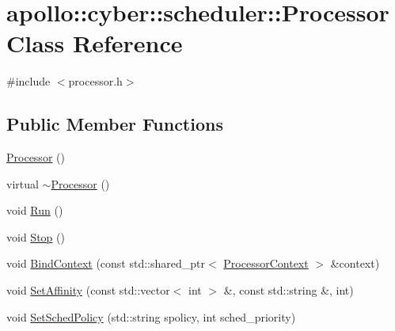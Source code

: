 \hypertarget{classapollo_1_1cyber_1_1scheduler_1_1Processor}{\section{apollo\-:\-:cyber\-:\-:scheduler\-:\-:Processor Class Reference}
\label{classapollo_1_1cyber_1_1scheduler_1_1Processor}
}


{\ttfamily \#include $<$processor.\-h$>$}

\subsection*{Public Member Functions}
\begin{DoxyCompactItemize}
\item 
\hyperlink{classapollo_1_1cyber_1_1scheduler_1_1Processor_a7a3447f8b5b52ff3a06ddd49af89cc94}{Processor} ()
\item 
virtual \hyperlink{classapollo_1_1cyber_1_1scheduler_1_1Processor_a1cdaf1b21f6ce895d2174bf606a09b94}{$\sim$\-Processor} ()
\item 
void \hyperlink{classapollo_1_1cyber_1_1scheduler_1_1Processor_a80d4e7a40b6cc550567e3ce65501f50b}{Run} ()
\item 
void \hyperlink{classapollo_1_1cyber_1_1scheduler_1_1Processor_a051ca1c0c4db0c90c486b81826c58108}{Stop} ()
\item 
void \hyperlink{classapollo_1_1cyber_1_1scheduler_1_1Processor_a3129843a2a28a39cdfe3bb261aedee03}{Bind\-Context} (const std\-::shared\-\_\-ptr$<$ \hyperlink{classapollo_1_1cyber_1_1scheduler_1_1ProcessorContext}{Processor\-Context} $>$ \&context)
\item 
void \hyperlink{classapollo_1_1cyber_1_1scheduler_1_1Processor_a4df86a908d96bbf1e072a6918d6ff2b0}{Set\-Affinity} (const std\-::vector$<$ int $>$ \&, const std\-::string \&, int)
\item 
void \hyperlink{classapollo_1_1cyber_1_1scheduler_1_1Processor_a9d95a996d51cc0cb9b59dfa81047d80d}{Set\-Sched\-Policy} (std\-::string spolicy, int sched\-\_\-priority)
\end{DoxyCompactItemize}

